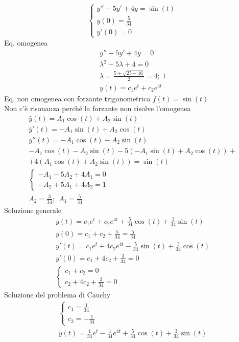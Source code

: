 \begin{esempio}
    \begin{equation}
        \begin{cases}
            y''-5y'+4y=\sin(t) \\
            y(0)= \frac{5}{34} \\
            y'(0)=0
        \end{cases}
    \end{equation}
    Eq. omogenea
    \begin{gather*}
        y''-5y'+4y=0 \\
        \lambda^2-5 \lambda+4 = 0 \\
        \lambda = \frac{5\pm\sqrt{25-16}}{2} = 4;\ 1 \\
        y(t)=c_1e^t+c_2e^{4t}
    \end{gather*}
    Eq. non omogenea con forzante trigonometrica $f(t)=\sin(t)$ \\
    Non c'è risonanza perché la forzante non risolve l'omogenea
    \begin{gather*}
        \bar{y}(t)=A_1\cos(t)+A_2\sin(t) \\
        \bar{y}'(t)=-A_1\sin(t)+A_2\cos(t) \\
        \bar{y}''(t)=-A_1\cos(t)-A_2\sin(t) \\
        -A_1\cos(t)-A_2\sin(t) -5(-A_1\sin(t)+A_2\cos(t))+\\
        +4(A_1\cos(t)+A_2\sin(t)) = \sin(t) \\
        \begin{cases}
            -A_1-5A_2+4A_1=0 \\
            -A_2+5A_1+4A_2=1
        \end{cases} \\
        A_2 = \frac{3}{34};\ \ A_1= \frac{5}{34}
    \end{gather*}
    Soluzione generale
    \begin{gather*}
        y(t)=c_1e^t+c_2e^{4t}+ \frac{5}{34}\cos(t) + \frac{3}{34}\sin(t) \\
        y(0)=c_1+c_2+ \frac{5}{34}= \frac{5}{34} \\
        y'(t) = c_1e^t+4c_2e^{4t}- \frac{5}{34}\sin(t)+ \frac{3}{34}\cos(t) \\
        y'(0) = c_1+4c_2+ \frac{3}{34}=0 \\
        \begin{cases}
            c_1+c_2 = 0 \\
            c_2+4c_2 + \frac{3}{34} = 0
        \end{cases}
    \end{gather*}
    Soluzione del problema di Cauchy
    \begin{gather}
        \begin{cases}
            c_1 = \frac{1}{34} \\
            c_2 = - \frac{1}{34}
        \end{cases} \\
        y(t) = \frac{1}{34}e^t - \frac{1}{34}e^{4t}+ \frac{5}{34}\cos(t)+ \frac{3}{34}\sin(t)
    \end{gather}
\end{esempio}



